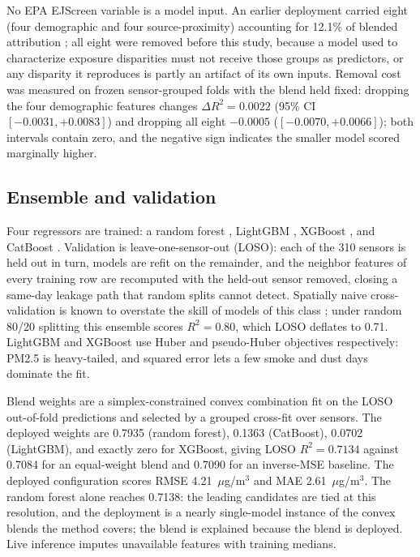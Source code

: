\documentclass[conference]{IEEEtran}
\newcommand{\ugm}{$\mu$g/m$^3$}
\begin{document}
No EPA EJScreen variable is a model input. An earlier deployment carried
eight (four demographic and four source-proximity) accounting for 12.1\%
of blended attribution \cite{ejscreen}; all eight were removed before
this study, because a model used to characterize exposure disparities
must not receive those groups as predictors, or any disparity it
reproduces is partly an artifact of its own inputs. Removal cost was
measured on frozen sensor-grouped folds with the blend held fixed:
dropping the four demographic features changes $\Delta R^2 = 0.0022$
(95\% CI $[-0.0031,+0.0083]$) and dropping all eight $-0.0005$
($[-0.0070,+0.0066]$); both intervals contain zero, and the negative
sign indicates the smaller model scored marginally higher.

\subsection{Ensemble and validation}
Four regressors are trained: a random forest \cite{breiman2001}, LightGBM
\cite{ke2017}, XGBoost \cite{chen2016}, and CatBoost
\cite{prokhorenkova2018}. Validation is leave-one-sensor-out (LOSO): each
of the 310 sensors is held out in turn, models are refit on the
remainder, and the neighbor features of every training row are recomputed
with the held-out sensor removed, closing a same-day leakage path that
random splits cannot detect. Spatially naive
cross-validation is known to overstate the skill of models of this class
\cite{meyer2022}; under random 80/20 splitting this ensemble scores
$R^2=0.80$, which LOSO deflates to 0.71. LightGBM and XGBoost use Huber
and pseudo-Huber objectives respectively: PM2.5 is heavy-tailed, and
squared error lets a few smoke and dust days dominate the fit.

Blend weights are a simplex-constrained convex combination fit on the
LOSO out-of-fold predictions and selected by a grouped cross-fit over
sensors. The deployed weights are 0.7935 (random forest), 0.1363
(CatBoost), 0.0702 (LightGBM), and exactly zero for XGBoost, giving LOSO
$R^2=0.7134$ against 0.7084 for an equal-weight blend and 0.7090 for an
inverse-MSE baseline. The deployed configuration scores RMSE 4.21~\ugm{}
and MAE 2.61~\ugm{}. The random forest alone reaches 0.7138: the leading
candidates are tied at this resolution, and the deployment is a nearly
single-model instance of the convex blends the method covers; the blend
is explained because the blend is deployed. Live inference imputes
unavailable features with training medians.
\end{document}
